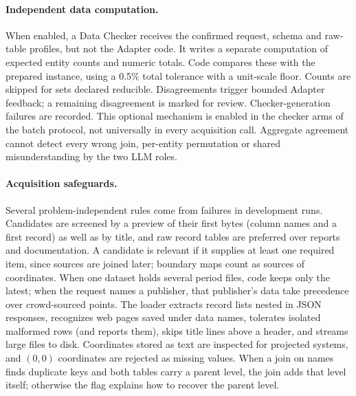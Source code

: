 \paragraph{Independent data computation.}
When enabled, a Data Checker receives the confirmed request, schema and raw-table profiles, but not the Adapter
code. It writes a separate computation of expected entity counts and numeric totals. Code compares these with
the prepared instance, using a 0.5\% total tolerance with a unit-scale floor. Counts are skipped for sets declared
reducible. Disagreements trigger bounded Adapter feedback; a remaining disagreement is marked for review.
Checker-generation failures are recorded. This optional mechanism is enabled in the checker arms of the batch
protocol, not universally in every acquisition call. Aggregate agreement cannot detect every wrong join,
per-entity permutation or shared misunderstanding by the two LLM roles.

\paragraph{Acquisition safeguards.}
Several problem-independent rules come from failures in development runs. Candidates are screened by a
preview of their first bytes (column names and a first record) as well as by title, and raw record tables are
preferred over reports and documentation. A candidate is relevant if it supplies at least one required item, since
sources are joined later; boundary maps count as sources of coordinates. When one dataset holds several period
files, code keeps only the latest; when the request names a publisher, that publisher's data take precedence over
crowd-sourced points. The loader extracts record lists nested in JSON responses, recognizes web pages saved
under data names, tolerates isolated malformed rows (and reports them), skips title lines above a header, and
streams large files to disk. Coordinates stored as text are inspected for projected systems, and $(0,0)$
coordinates are rejected as missing values. When a join on names finds duplicate keys and both tables carry a
parent level, the join adds that level itself; otherwise the flag explains how to recover the parent level.

